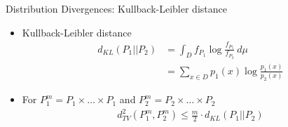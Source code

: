 \documentclass[handout]{beamer}
\begin{document}
\begin{frame}{Distribution Divergences: Kullback-Leibler distance}
\begin{itemize}
\item Kullback-Leibler distance
\begin{align*}
d_{KL}(P_{1}||P_{2})&= \int_{D} f_{P_{1}}\log \frac{f_{P_{1}}}{f_{P_{2}}}~d\mu\\
&=\sum_{x\in D} p_{1}(x)\log \frac{p_{1}(x)}{p_{2}(x)}
\end{align*}
\item For $P_{1}^{m}=P_{1}\times\ldots\times P_{1}$ and $P_{2}^{m}=P_{2}\times\ldots\times P_{2}$
\begin{align}d_{TV}^{2}(P_{1}^{m},P_{2}^{m})\leq \frac{m}{2}\cdot d_{KL}(P_{1}||P_{2})\end{align}
\end{itemize}
\end{frame}
\end{document}
